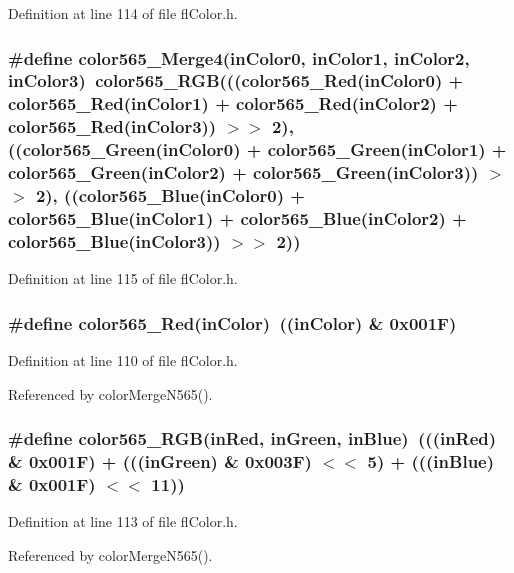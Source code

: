 Definition at line 114 of file fl\-Color.h.
\subsubsection{\setlength{\rightskip}{0pt plus 5cm}\#define color565\_\-Merge4(in\-Color0, in\-Color1, in\-Color2, in\-Color3)~color565\_\-RGB(((color565\_\-Red(in\-Color0) + color565\_\-Red(in\-Color1) + color565\_\-Red(in\-Color2) + color565\_\-Red(in\-Color3)) $>$$>$ 2), ((color565\_\-Green(in\-Color0) + color565\_\-Green(in\-Color1) + color565\_\-Green(in\-Color2) + color565\_\-Green(in\-Color3)) $>$$>$ 2), ((color565\_\-Blue(in\-Color0) + color565\_\-Blue(in\-Color1) + color565\_\-Blue(in\-Color2) + color565\_\-Blue(in\-Color3)) $>$$>$ 2))}\label{flColor_8h_0d108b48bd76b845b700acb6c4b39885}




Definition at line 115 of file fl\-Color.h.
\subsubsection{\setlength{\rightskip}{0pt plus 5cm}\#define color565\_\-Red(in\-Color)~((in\-Color) \& 0x001F)}\label{flColor_8h_20aa5ee6336b1d64bff2c05ccb1665fc}




Definition at line 110 of file fl\-Color.h.

Referenced by color\-Merge\-N565().
\subsubsection{\setlength{\rightskip}{0pt plus 5cm}\#define color565\_\-RGB(in\-Red, in\-Green, in\-Blue)~(((in\-Red) \& 0x001F) + (((in\-Green) \& 0x003F) $<$$<$ 5) + (((in\-Blue) \& 0x001F) $<$$<$ 11))}\label{flColor_8h_689396802693078d06461d6bde9f0c59}




Definition at line 113 of file fl\-Color.h.

Referenced by color\-Merge\-N565().
